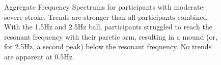 \documentclass{article}
\begin{document}
\begin{figure}[!ht]
     \centering
     \hfill
     \hfill
	\caption{Aggregate Frequency Spectrums for participants with moderate-severe stroke. Trends are stronger than all participants combined. With the 1.5Hz and 2.5Hz ball, participants struggled to reach the resonant frequency with their paretic arm, resulting in a mound (or, for 2.5Hz, a second peak) below the resonant frequency. No trends are apparent at 0.5Hz.}
\end{figure}
\end{document}
